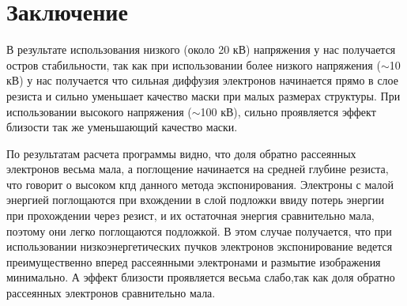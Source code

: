 \chapter*{Заключение}
В результате использования низкого (около 20 кВ) напряжения у нас получается остров стабильности,
так как при использовании более низкого напряжения (\(\sim\)10 кВ) у нас получается что сильная диффузия электронов начинается прямо в слое резиста и сильно уменьшает качество маски при малых размерах структуры.
При использовании высокого напряжения (\(\sim\)100 кВ), сильно проявляется эффект близости так же уменьшающий качество маски.

По результатам расчета программы видно, что доля обратно рассеянных электронов весьма мала, а поглощение начинается на средней глубине резиста, что говорит о высоком кпд данного метода экспонирования. Электроны с малой энергией поглощаются при вхождении в слой подложки ввиду потерь энергии при прохождении через резист, и их остаточная энергия сравнительно мала, поэтому они легко поглощаются подложкой. В этом случае получается, что при использовании низкоэнергетических пучков электронов экспонирование ведется преимущественно вперед рассеянными электронами и размытие изображения минимально. А эффект близости проявляется весьма слабо,так как доля обратно рассеянных электронов сравнительно мала.

